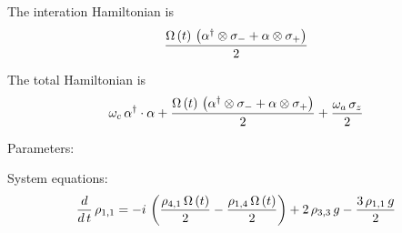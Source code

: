 \documentclass{minimal}
\begin{document}
The interation Hamiltonian is \[ \hint{} \]

The total Hamiltonian is \[ \Hamiltonian{} \]

Parameters:



System equations: \[ \eqs{} \]
	
\end{document}
